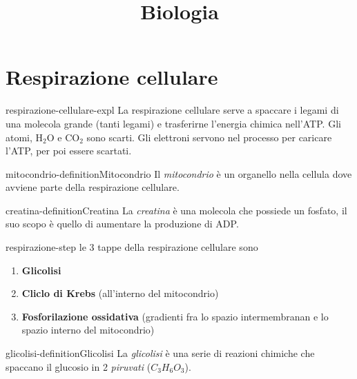 \documentclass[preview]{standalone}
\begin{document}
\title{Biologia}
\genpage

\section{Respirazione cellulare}


\begin{snippet}{respirazione-cellulare-expl}
    La respirazione cellulare serve a spaccare i legami di una molecola grande
    (tanti legami) e trasferirne l'energia chimica nell'ATP.
    Gli atomi, H\({}_2\)O e CO\({}_2\) sono scarti. Gli elettroni servono nel processo per caricare l'ATP, per poi
    essere scartati.
\end{snippet}

\begin{snippetdefinition}{mitocondrio-definition}{Mitocondrio}
    Il \textit{mitocondrio} è un organello nella cellula dove avviene parte della respirazione cellulare.
\end{snippetdefinition}


\begin{snippetdefinition}{creatina-definition}{Creatina}
    La \textit{creatina} è una molecola che possiede un fosfato, il suo scopo è quello di aumentare la produzione di ADP.
\end{snippetdefinition}

\begin{snippet}{respirazione-step}
    le 3 tappe della respirazione cellulare sono
    \begin{enumerate}
        \item \textbf{Glicolisi}
        \item \textbf{Cliclo di Krebs} (all'interno del mitocondrio)
        \item \textbf{Fosforilazione ossidativa} (gradienti fra lo spazio intermembranan e lo spazio interno del mitocondrio)
    \end{enumerate}
\end{snippet}

\begin{snippetdefinition}{glicolisi-definition}{Glicolisi}
    La \textit{glicolisi} è una serie di reazioni chimiche che spaccano il glucosio in 2 \textit{piruvati} (\(C_3H_6O_3\)).
\end{snippetdefinition}
\end{document}
